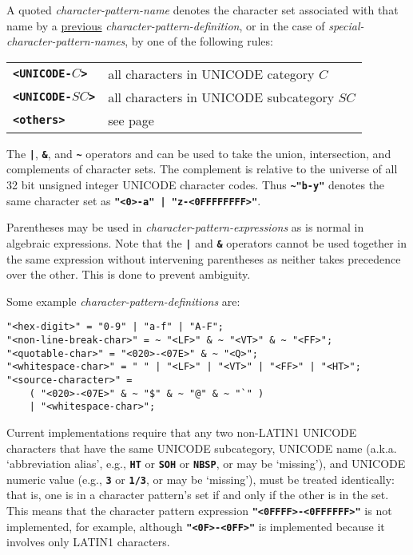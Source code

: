 \documentclass[12pt]{article}
\newcommand{\TT}[1]{{\tt \bfseries #1}}
\newenvironment{indpar}[1][0.3in]%
	{\begin{list}{}%
		     {\setlength{\itemsep}{0in}%
		      \setlength{\topsep}{0in}%
		      \setlength{\parsep}{1ex}%
		      \setlength{\labelwidth}{#1}%
		      \setlength{\leftmargin}{#1}%
		      \addtolength{\leftmargin}{\labelsep}}%
	 \item}%
	{\end{list}}
\begin{document}
A quoted {\em character-pattern-name} denotes the character set associated
with that name by a \underline{previous} {\em character-pattern-definition},
or in the case of {\em special-character-pattern-names}, by one of the
following rules:
\begin{center}
\begin{tabular}{ll}
\TT{<UNICODE-$C$>} & all characters in UNICODE category $C$ \\
\TT{<UNICODE-$SC$>} & all characters in UNICODE subcategory $SC$ \\
\TT{<others>} & see page \pageref{<OTHERS>} \\
\end{tabular}
\end{center}

The \TT{|}, \TT{\&}, and \TT{\textasciitilde} operators and can be used to take
the union, intersection, and complements of character sets.  The complement
is relative to the universe of all 32 bit unsigned integer UNICODE
character codes.  Thus \TT{\textasciitilde "b-y"}
denotes the same character set as
\TT{"<0>-a"\,|\,"z-<0FFFFFFFF>"}.

Parentheses may be used in {\em character-pattern-expressions} as is
normal in algebraic expressions.
Note that the \TT{|} and \TT{\&} operators cannot be used together
in the same expression without intervening parentheses as neither
takes precedence over the other.  This is done to prevent ambiguity.

Some example {\em character-pattern-definitions} are:

\begin{indpar}[0.05in]\begin{verbatim}
"<hex-digit>" = "0-9" | "a-f" | "A-F";
"<non-line-break-char>" = ~ "<LF>" & ~ "<VT>" & ~ "<FF>";
"<quotable-char>" = "<020>-<07E>" & ~ "<Q>";
"<whitespace-char>" = " " | "<LF>" | "<VT>" | "<FF>" | "<HT>";
"<source-character>" =
    ( "<020>-<07E>" & ~ "$" & ~ "@" & ~ "`" )
    | "<whitespace-char>";
\end{verbatim}\end{indpar}

Current implementations require that any two non-LATIN1 UNICODE
characters that have the same UNICODE subcategory, UNICODE name
(a.k.a. `abbreviation alias',
e.g., \TT{HT} or \TT{SOH} or \TT{NBSP}, or may be `missing'),
and UNICODE numeric value (e.g., \TT{3} or \TT{1/3}, or may be `missing'),
must be treated identically: that is, one is in a character pattern's set
if and only if the other is in the set.  This means that the
character pattern expression \TT{"<0FFFF>-<0FFFFFF>"} is not implemented,
for example, although \TT{"<0F>-<0FF>"} is implemented because it
involves only LATIN1 characters.
\end{document}
